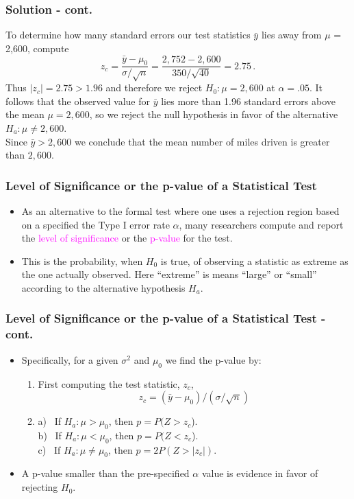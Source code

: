 \documentclass[xcolor=dvipsnames,12pt]{beamer}
\begin{document}
\begin{frame}
\frametitle{Solution - cont.} 
To determine how many standard errors our test statistics
$\bar{y}$ lies away from $\mu$ = 2,600,  compute
$$
  z_c = \frac{\bar{y}-\mu_0}{\sigma/\sqrt{n}} =
  \frac{2,752 - 2,600}{350/\sqrt{40}} = 2.75 \, .
$$
Thus $|z_c|=2.75>1.96$ and therefore we reject   $H_0: \mu = 2,600 $
at $\alpha=.05$.
It follows that the observed value for $\bar{y}$ lies more than 
1.96 standard errors above the mean $\mu = 2,600 $, so we reject 
the null hypothesis in favor of the alternative $H_a: \mu \neq
2,600$. \\
 Since $\bar{y}>2,600$ we conclude that the mean number 
of miles driven is greater than $2,600$.
\end{frame}




\begin{frame}
\frametitle{Level of Significance or the p-value of a Statistical Test}
\begin{itemize}
\item   As an alternative to the formal test where one uses a rejection
region based on a specified the Type I error rate $\alpha$, 
many researchers compute and report the \textcolor{magenta}{level of 
significance} or  the  \textcolor{magenta}{p-value} for the test.  
\item This is the probability, when $H_0$ is true,  of observing a statistic as
extreme as the one actually observed.  Here ``extreme'' is  means ``large''
or ``small'' according to the alternative hypothesis $H_a$.
\end{itemize}
\end{frame}




\begin{frame}
\frametitle{Level of Significance or the p-value of a Statistical Test - cont.}
\begin{itemize}
\item Specifically, for a  given $\sigma^2$ and $\mu_0$ we find the p-value by:
\begin{enumerate}
\item[\textcolor{magenta}{1.}] First computing the test statistic,  $z_c$, 
       $$
         z_c = (\bar{y} - \mu_0)/(\sigma/\sqrt{n})
       $$
\item[\textcolor{magenta}{2.}]
      a) \ If $H_a: \mu > \mu_0$, then $p = P(Z > z_c$).\\
      b) \ If $H_a: \mu < \mu_0$, then $p = P(Z < z_c$).\\
      c) \ If $H_a: \mu \neq \mu_0$, then $p=2P(Z > |z_c|)$.
\end{enumerate}

\item A p-value smaller than the pre-specified $\alpha$ value is 
evidence in favor of rejecting $H_0$.
\end{itemize}
\end{frame}
\end{document}
